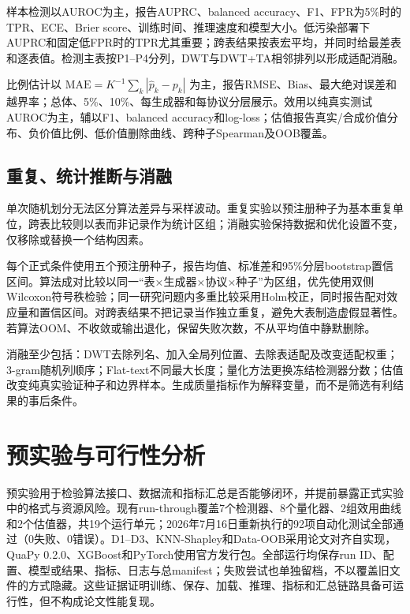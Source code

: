 \documentclass[
  chinese,
  12pt,
  a4paper,
  chinese,
  UTF8]{ctexart}
\begin{document}
样本检测以AUROC为主，报告AUPRC、balanced
accuracy、F1、FPR为5\%时的TPR、ECE、Brier
score、训练时间、推理速度和模型大小。低污染部署下AUPRC和固定低FPR时的TPR尤其重要；跨表结果按表宏平均，并同时给最差表和逐表值。检测主表按P1--P4分列，DWT与DWT+TA相邻排列以形成适配消融。

比例估计以 \(\mathrm{MAE}=K^{-1}\sum_k|\hat p_k-p_k|\)
为主，报告RMSE、Bias、最大绝对误差和越界率；总体、5\%、10\%、每生成器和每协议分层展示。效用以纯真实测试AUROC为主，辅以F1、balanced
accuracy和log-loss；估值报告真实/合成价值分布、负价值比例、低价值删除曲线、跨种子Spearman及OOB覆盖。

\subsection{重复、统计推断与消融}\label{ux91cdux590dux7edfux8ba1ux63a8ux65adux4e0eux6d88ux878d}

单次随机划分无法区分算法差异与采样波动。重复实验以预注册种子为基本重复单位，跨表比较则以表而非记录作为统计区组；消融实验保持数据和优化设置不变，仅移除或替换一个结构因素。

每个正式条件使用五个预注册种子，报告均值、标准差和95\%分层bootstrap置信区间。算法成对比较以同一``表×生成器×协议×种子''为区组，优先使用双侧Wilcoxon符号秩检验；同一研究问题内多重比较采用Holm校正，同时报告配对效应量和置信区间。对跨表结果不把记录当作独立重复，避免大表制造虚假显著性。若算法OOM、不收敛或输出退化，保留失败次数，不从平均值中静默删除。

消融至少包括：DWT去除列名、加入全局列位置、去除表适配及改变适配权重；3-gram随机列顺序；Flat-text不同最大长度；量化方法更换冻结检测器分数；估值改变纯真实验证种子和边界样本。生成质量指标作为解释变量，而不是筛选有利结果的事后条件。

\section{预实验与可行性分析}\label{ux9884ux5b9eux9a8cux4e0eux53efux884cux6027ux5206ux6790}

预实验用于检验算法接口、数据流和指标汇总是否能够闭环，并提前暴露正式实验中的格式与资源风险。现有run-through覆盖7个检测器、8个量化器、2组效用曲线和2个估值器，共19个运行单元；2026年7月16日重新执行的92项自动化测试全部通过（0失败、0错误）。D1--D3、KNN-Shapley和Data-OOB采用论文对齐自实现，QuaPy
0.2.0、XGBoost和PyTorch使用官方发行包。全部运行均保存run
ID、配置、模型或结果、指标、日志与总manifest；失败尝试也单独留档，不以覆盖旧文件的方式隐藏。这些证据证明训练、保存、加载、推理、指标和汇总链路具备可运行性，但不构成论文性能复现。
\end{document}

